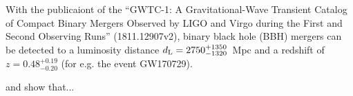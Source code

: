 \documentclass[11pt,a4paper]{article}
\begin{document}

With the publicaiont of the ``GWTC-1: A Gravitational-Wave Transient
Catalog of Compact Binary Mergers Observed by LIGO and Virgo during
the First and Second Observing Runs'' (1811.12907v2), binary black
hole (BBH) mergers can be detected to a luminosity distance $d_{\rm L}
= 2750^{+1350}_{-1320}$~Mpc and a redshift of $z=0.48^{+0.19}_{-0.20}$
(for e.g. the event GW170729).

\citep{Ross2018} and \citet{McKernan2018} show that...


\clearpage


\end{document}
